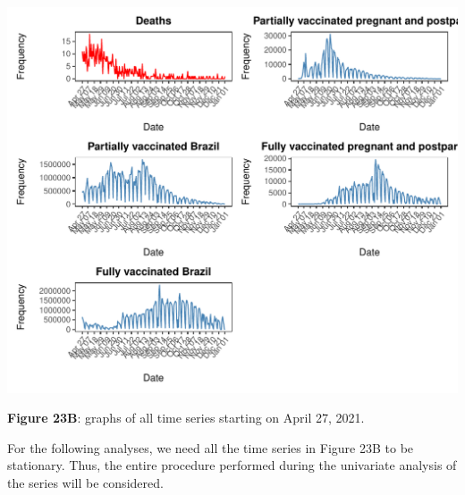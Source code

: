 \documentclass[
]{article}
\begin{document}
\begin{center}\includegraphics[width=\linewidth]{IF_results_ENG_files/figure-latex/unnamed-chunk-32-1} \end{center}

\textbf{Figure 23B}: graphs of all time series starting on April 27,
2021.

For the following analyses, we need all the time series in Figure 23B to
be stationary. Thus, the entire procedure performed during the
univariate analysis of the series will be considered.
\end{document}
